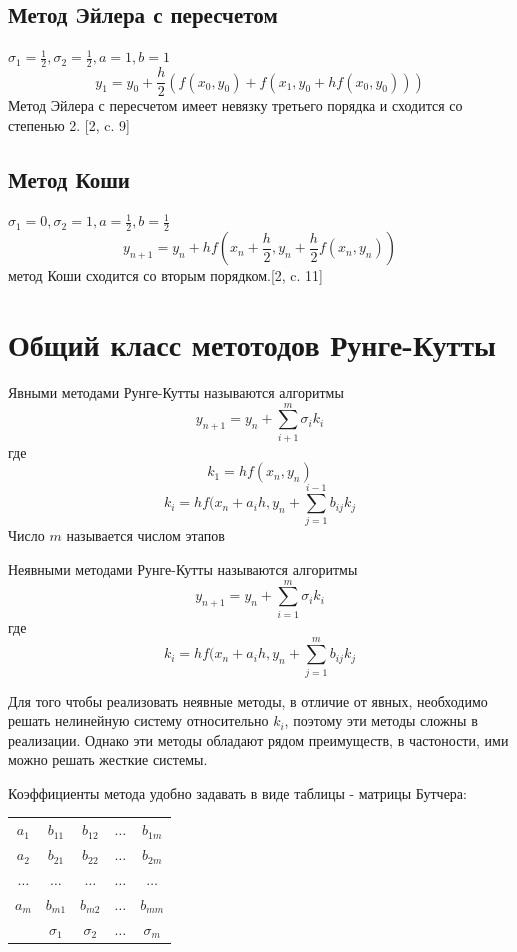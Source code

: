 \documentclass[a4paper, 14pt]{extarticle}
\begin{document}
\subsection{Метод Эйлера с пересчетом}
\(\sigma_1=\frac12,\sigma_2=\frac12,a=1,b=1\)
\[  y_1=y_0+\frac{h}{2}(f(x_0,y_0)+f(x_1,y_0+hf(x_0,y_0)))  \]
Метод Эйлера с пересчетом имеет невязку третьего порядка и сходится со степенью 2. [2, c. 9]

\subsection{Метод Коши}
\(\sigma_1=0,\sigma_2=1,a=\frac12,b=\frac12\)
\[ y_{n+1}=y_n+hf(x_n+\frac{h}{2},y_n+\frac{h}{2}f(x_n,y_n)) \]
метод Коши сходится со вторым порядком.[2, c. 11]

\section{Общий класс метотодов Рунге-Кутты}
Явными методами Рунге-Кутты называются алгоритмы
\[y_{n+1}=y_n+\sum^m_{i+1}\sigma_ik_i\]
где
\[k_1=hf(x_n,y_n)\]
\[k_i=hf(x_n+a_ih,y_n+\sum^{i-1}_{j=1}b_{ij}k_j\]
Число \(m\) называется числом этапов
\par
Неявными методами Рунге-Кутты называются алгоритмы
\[y_{n+1}=y_n+\sum^m_{i=1}\sigma_ik_i\]
где
\[k_i=hf(x_n+a_ih,y_n+\sum^m_{j=1}b_{ij}k_j\]

Для того чтобы реализовать неявные методы, в отличие от явных, необходимо решать нелинейную систему
относительно \(k_i\), поэтому эти методы сложны в реализации. Однако эти методы обладают рядом преимуществ, в 
частоности, ими можно решать жесткие системы.

Коэффициенты метода удобно задавать в виде таблицы - матрицы Бутчера:

\begin{center}
\begin{tabular}{c|c c c c}
     $a_1$ & $b_{11}$ & $b_{12}$ & $\ldots$ & $b_{1m}$ \\
     $a_2$ & $b_{21}$ & $b_{22}$ & $\ldots$ & $b_{2m}$ \\
     $\ldots$ & $\ldots$ & $\ldots$ & $\ldots$ & $\ldots$ \\
     $a_m$ & $b_{m1}$ & $b_{m2}$ & $\ldots$ & $b_{mm}$ \\
     \hline
      & $\sigma_1$ & $\sigma_2$ & $\ldots$ & $\sigma_m$
\end{tabular}    
\end{center}
\end{document}
